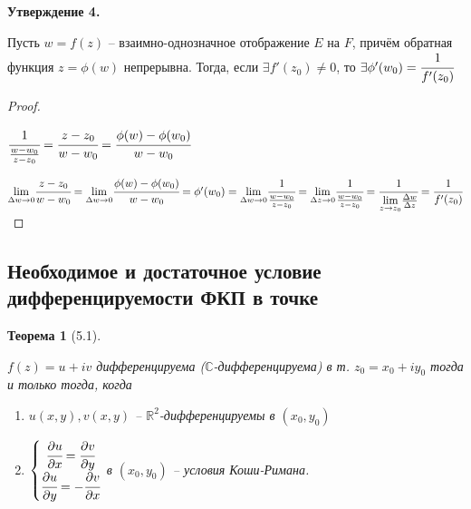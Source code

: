 \documentclass[final]{report}
\newcommand{\forcenewline}{$\phantom{\mbox{newline}}$\newline}
\newcommand{\dd}{\partial}
\newcommand{\R}{\mathbb{R}}
\renewcommand{\C}{\mathbb{C}}
\newcommand{\mlim}[1]{\underset{#1}{\lim}}
\renewcommand{\f}{\phi}
\newcommand{\D}{\Delta}
\newcommand{\sys}[1]{\left\{\begin{matrix}#1\end{matrix}\right.}
\newtheorem*{theor}{Теорема}
\theoremstyle{remark}
\begin{document}
{\bfseries Утверждение 4.}

Пусть $w=f(z)$ -- взаимно-однозначное отображение $E$ на $F$, причём обратная функция $z=\phi(w)$ непрерывна. Тогда, если $\exists f'(z_0)\neq0$, то $\exists \phi'(w_0)=\cfrac{1}{f'(z_0)}$

\begin{proof}
\forcenewline

$\cfrac{1}{\frac{w-w_0}{z-z_0}}=\cfrac{z-z_0}{w-w_0}=\cfrac{\f(w)-\f(w_0)}{w-w_0}$

$\mlim{\D w\to 0}\cfrac{z-z_0}{w-w_0}=\mlim{\D w\to0}\cfrac{\f(w)-\f(w_0)}{w-w_0}=\f'(w_0)=\mlim{\D w\to0}\cfrac{1}{\frac{w-w_0}{z-z_0}}=\mlim{\D z\to0}\cfrac{1}{\frac{w-w_0}{z-z_0}}=\cfrac{1}{\mlim{z\to z_0}\frac{\D w}{\D z}}=\cfrac{1}{f'(z_0)}$
\end{proof}

\subsection{Необходимое и достаточное условие дифференцируемости ФКП в точке}

\begin{theor}[5.1]
\forcenewline

$f(z)=u+iv$ дифференцируема ($\C$-дифференцируема) в т. $z_0=x_0+iy_0$ тогда и только тогда, когда \begin{enumerate}
\item $u(x,y),v(x,y)$ -- $\R^2$-дифференцируемы в $(x_0,y_0)$
\item $\sys{\cfrac{\dd u}{\dd x}=\cfrac{\dd v}{\dd y} \\ \cfrac{\dd u}{\dd y}=-\cfrac{\dd v}{\dd x}}$ в $(x_0,y_0)$ -- условия Коши-Римана.
\end{enumerate}
\end{theor}
\end{document}

